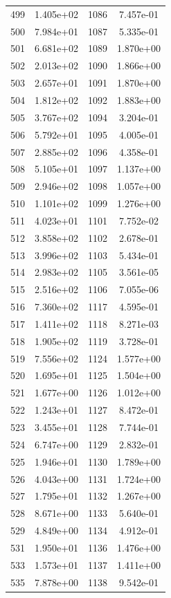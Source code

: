 \documentclass[12pt]{article}
\begin{document}
\begin{longtable}{@{}cccc@{}}
499 & 1.405e+02 & 1086 & 7.457e-01 \\
500 & 7.984e+01 & 1087 & 5.335e-01 \\
501 & 6.681e+02 & 1089 & 1.870e+00 \\
502 & 2.013e+02 & 1090 & 1.866e+00 \\
503 & 2.657e+01 & 1091 & 1.870e+00 \\
504 & 1.812e+02 & 1092 & 1.883e+00 \\
505 & 3.767e+02 & 1094 & 3.204e-01 \\
506 & 5.792e+01 & 1095 & 4.005e-01 \\
507 & 2.885e+02 & 1096 & 4.358e-01 \\
508 & 5.105e+01 & 1097 & 1.137e+00 \\
509 & 2.946e+02 & 1098 & 1.057e+00 \\
510 & 1.101e+02 & 1099 & 1.276e+00 \\
511 & 4.023e+01 & 1101 & 7.752e-02 \\
512 & 3.858e+02 & 1102 & 2.678e-01 \\
513 & 3.996e+02 & 1103 & 5.434e-01 \\
514 & 2.983e+02 & 1105 & 3.561e-05 \\
515 & 2.516e+02 & 1106 & 7.055e-06 \\
516 & 7.360e+02 & 1117 & 4.595e-01 \\
517 & 1.411e+02 & 1118 & 8.271e-03 \\
518 & 1.905e+02 & 1119 & 3.728e-01 \\
519 & 7.556e+02 & 1124 & 1.577e+00 \\
520 & 1.695e+01 & 1125 & 1.504e+00 \\
521 & 1.677e+00 & 1126 & 1.012e+00 \\
522 & 1.243e+01 & 1127 & 8.472e-01 \\
523 & 3.455e+01 & 1128 & 7.744e-01 \\
524 & 6.747e+00 & 1129 & 2.832e-01 \\
525 & 1.946e+01 & 1130 & 1.789e+00 \\
526 & 4.043e+00 & 1131 & 1.724e+00 \\
527 & 1.795e+01 & 1132 & 1.267e+00 \\
528 & 8.671e+00 & 1133 & 5.640e-01 \\
529 & 4.849e+00 & 1134 & 4.912e-01 \\
531 & 1.950e+01 & 1136 & 1.476e+00 \\
533 & 1.573e+01 & 1137 & 1.411e+00 \\
535 & 7.878e+00 & 1138 & 9.542e-01 \\

\end{longtable}
\end{document}
